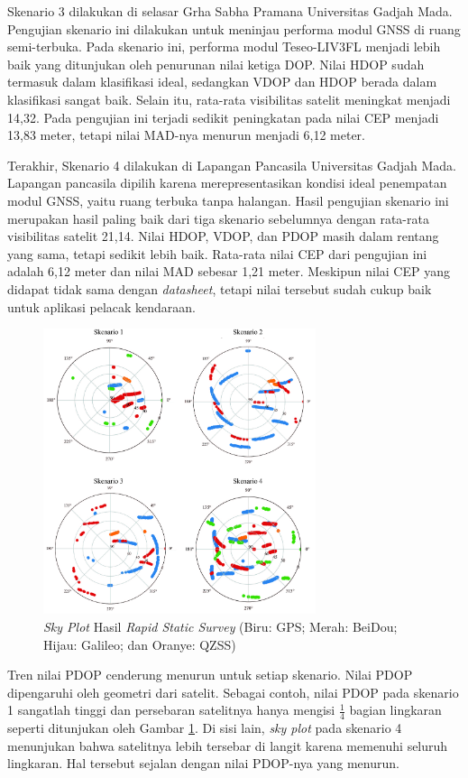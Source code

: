 \documentclass[conference]{IEEEtran}
\begin{document}
Skenario 3 dilakukan di selasar Grha Sabha Pramana Universitas Gadjah Mada. Pengujian skenario ini dilakukan untuk meninjau performa modul GNSS di ruang semi-terbuka. Pada skenario ini, performa modul Teseo-LIV3FL menjadi lebih baik yang ditunjukan oleh penurunan nilai ketiga DOP. Nilai HDOP sudah termasuk dalam klasifikasi ideal, sedangkan VDOP dan HDOP berada dalam klasifikasi sangat baik. Selain itu, rata-rata visibilitas satelit meningkat menjadi 14,32. Pada pengujian ini terjadi sedikit peningkatan pada nilai CEP menjadi 13,83 meter, tetapi nilai MAD-nya menurun menjadi 6,12 meter.

 Terakhir, Skenario 4 dilakukan di Lapangan Pancasila Universitas Gadjah Mada. Lapangan pancasila dipilih karena merepresentasikan kondisi ideal penempatan modul GNSS, yaitu ruang terbuka tanpa halangan. Hasil pengujian skenario ini merupakan hasil paling baik dari tiga skenario sebelumnya dengan rata-rata visibilitas satelit 21,14. Nilai HDOP, VDOP, dan PDOP masih dalam rentang yang sama, tetapi sedikit lebih baik. Rata-rata nilai CEP dari pengujian ini adalah 6,12 meter  dan nilai MAD sebesar 1,21 meter. Meskipun nilai CEP yang didapat tidak sama dengan \textit{datasheet}, tetapi nilai tersebut sudah cukup baik untuk aplikasi pelacak kendaraan.

\begin{figure}[htb!]
	\centering
	\includegraphics[width=8cm]{skyplot.jpg}
	\caption{\textit{Sky Plot} Hasil \textit{Rapid Static Survey} (Biru: GPS; Merah: BeiDou; Hijau: Galileo; dan Oranye: QZSS)}
	\label{fig: 4-skyplot}
\end{figure}

Tren nilai PDOP cenderung menurun untuk setiap skenario. Nilai PDOP dipengaruhi oleh geometri dari satelit. Sebagai contoh, nilai PDOP pada skenario 1 sangatlah tinggi dan persebaran satelitnya hanya mengisi $\frac{1}{4}$ bagian lingkaran seperti ditunjukan oleh Gambar \ref{fig: 4-skyplot}. Di sisi lain, \textit{sky plot} pada skenario 4 menunjukan bahwa satelitnya lebih tersebar di langit karena memenuhi seluruh lingkaran. Hal tersebut sejalan dengan nilai PDOP-nya yang menurun.
\end{document}

